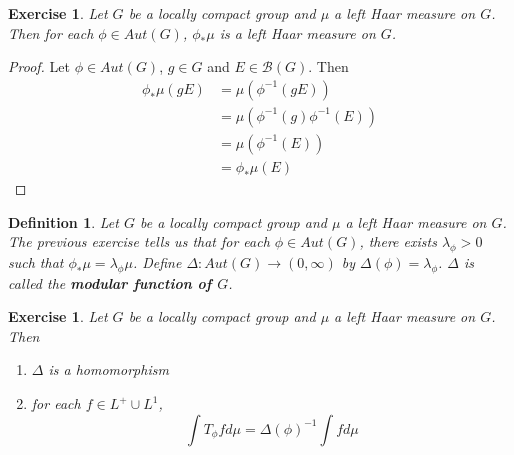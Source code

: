 \documentclass[12pt]{amsart}
\newtheorem{defn}[thm]{Definition}
\newtheorem{ex}[thm]{Exercise}
\newcommand{\Del}{\Delta}
\newcommand{\lam}{\lambda}
\newcommand{\MB}{\mathcal{B}}
\begin{document}
	\begin{ex}
		Let $G$ be a locally compact group and $\mu$ a left Haar measure on $G$. Then for each $\phi \in Aut(G)$, $\phi_*\mu$ is a left Haar measure on $G$.
	\end{ex}

	\begin{proof}
		Let $\phi \in Aut(G)$, $g \in G$ and $E \in \MB(G)$. Then 
		\begin{align*}
			\phi_* \mu(g E) 
			& = \mu (\phi^{-1}(gE)) \\ 
			& = \mu (\phi^{-1}(g) \phi^{-1}(E)) \\
			& = \mu(\phi^{-1}(E)) \\ 
			& = \phi_* \mu(E)
		\end{align*}
	\end{proof}

	\begin{defn}
		Let $G$ be a locally compact group and $\mu$ a left Haar measure on $G$. The previous exercise tells us that for each $\phi \in Aut(G)$, there exists $\lam_{\phi} > 0 $ such that $\phi_* \mu = \lam_{\phi} \mu$. Define $\Del : Aut(G) \rightarrow (0, \infty)$ by $\Del(\phi) = \lam_{\phi}$. $\Del$ is called the \textbf{modular function of $G$}.
	\end{defn}

	\begin{ex}
		Let $G$ be a locally compact group and $\mu$ a left Haar measure on $G$. Then 
		\begin{enumerate}
			\item $\Del$ is a homomorphism
			\item for each $f \in L^+ \cup L^1$, $$\int T_{\phi} f d \mu = \Del(\phi)^{-1} \int f d \mu$$
		\end{enumerate}	
	\end{ex}
\end{document}
